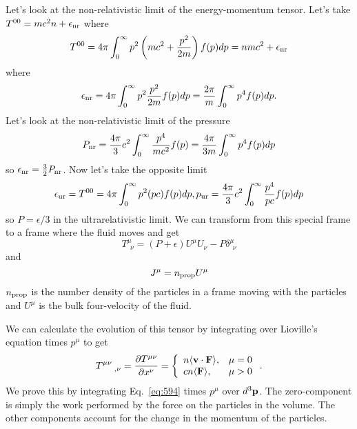 Let's look at the non-relativistic limit of the energy-momentum tensor.
Let's take $T^{00} = mc^2 n + \epsilon_{\hbox{\rm \scriptsize nr}}$ where
\begin{equation}
T^{00} = 4\pi \int_0^\infty p^2 \left (mc^2 + \frac{p^2}{2m} \right )
f(p) dp = n mc^2 + \epsilon_{\hbox{\rm \scriptsize nr}}
\label{eq:611}
\end{equation}
where
\begin{equation}
\epsilon_{\hbox{\rm \scriptsize nr}} = 4\pi \int_0^\infty p^2 \frac{p^2}{2m} f(p) dp =
\frac{2\pi}{m} \int_0^\infty p^4 f(p) dp.
\label{eq:612}
\end{equation}
Let's look at the non-relativistic limit of the pressure
\begin{equation}
P_{\hbox{\rm \scriptsize nr}} = \frac{4 \pi}{3} c^2 \int_0^\infty \frac{p^4}{mc^2}
f(p) = \frac{4\pi}{3m} \int_0^\infty p^4 f(p) dp
\label{eq:613}
\end{equation}
so $\epsilon_{\hbox{\rm \scriptsize nr}} = \frac{3}{2} P_{\hbox{\rm \scriptsize nr}}$.  Now let's take
the opposite limit
\begin{equation}
\epsilon_{\hbox{\rm \scriptsize ur}} = T^{00} = 4 \pi \int_0^\infty p^2 (p c) f(p) dp,
p_{\hbox{\rm \scriptsize ur}} = \frac{4\pi}{3} c^2 \int_0^\infty \frac{p^4}{pc} f(p) dp
\label{eq:614}
\end{equation}
so $P=\epsilon/3$ in the ultrarelativistic limit.  We can transform
from this special frame to a frame where the fluid moves and get
\begin{equation}
T^\mu_{~~\nu} = (P + \epsilon) U^\mu U_\nu - P \delta^\mu_{~~\nu}
\label{eq:615}
\end{equation}
and 
\begin{equation}
J^\mu = n_{\hbox{\rm \scriptsize prop}} U^\mu
\label{eq:616}
\end{equation}
$n_{\hbox{\rm \scriptsize prop}}$ is the number density of the particles in a frame
moving with the particles and $U^\mu$ is the bulk four-velocity of the
fluid. 

We can calculate the evolution of this tensor by integrating over
Lioville's equation times $p^\mu$ to get
\begin{equation}
T^{\mu\nu}_{~~~~,\nu} = \frac{\partial {T^{\mu\nu}}}{\partial {x^\nu}} = \left \{ \begin{array}{ll}
n \langle {\bf v} \cdot {\bf F} \rangle, & \mu = 0 \\
c n \langle {\bf F} \rangle, & \mu > 0 
\end{array} \right . .
\label{eq:617}
\end{equation}
We prove this by integrating Eq.~\ref{eq:594} times $p^\mu$ over $d^3{\bf p}$.
The zero-component is simply the work performed by the force on the
particles in the volume.  The other components account for the change
in the momentum of the particles.

